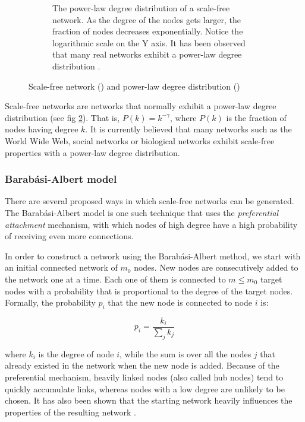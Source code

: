 \begin{figure}
\begin{subfigure}[b]{0.5\textwidth}
    \caption{The power-law degree distribution of a scale-free network. As the degree of
the nodes gets larger, the fraction of nodes decreases exponentially. Notice
the logarithmic scale on the Y axis. It has been observed that many real
networks exhibit a power-law degree distribution \cite{jeong2000large,faloutsos1999power,adamic2001search}.}
    \label{fig:degree_distribution}    
   \end{subfigure}
   \caption[Power-law degree distribution of a scale free network]{Scale-free network () and power-law degree distribution ()}
   \label{fig:scale_free} 
\end{figure}


Scale-free networks are networks that normally exhibit a power-law degree
distribution (see fig \ref{fig:scale_free}). That is, $ P(k) = k^{-\gamma} $,
where $P(k)$ is the fraction of nodes having degree $k$. It is currently believed that many networks such as the
World Wide Web, social networks or biological networks exhibit scale-free properties with a power-law degree distribution.

\subsubsection{Barab\'{a}si-Albert model}

There are several proposed ways in which scale-free networks can be
generated. The Barab\'{a}si-Albert model is one such technique that uses the
\emph{preferential attachment} mechanism, with which nodes of high degree have
a high probability of receiving even more connections. 

In order to construct a network using the Barab\'{a}si-Albert method, we start with
an initial connected network of $ m_0  $ nodes. New nodes are consecutively
added to the network one at a time. Each one of them is connected to $ m \le m_0 
$ target nodes with a probability that is proportional to the degree of the
target nodes. Formally, the probability $ p_i $ that the new node is connected
to node $i$ is:

\begin{equation}
 p_i = \frac{k_i}{\sum_{j}k_j}
\end{equation}

where $ k_i $ is the degree of node $i$, while the sum is over all the
nodes $j$ that already existed in the network when the new node is added. Because
of the preferential mechanism, heavily linked nodes (also called hub nodes)
tend to quickly accumulate links, whereas nodes with a low degree are unlikely
to be chosen. It has also been shown that the starting network heavily
influences the properties of the resulting network \cite{hormozdiari2007not}.

